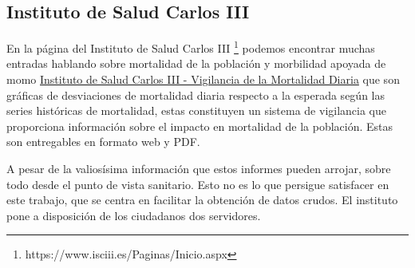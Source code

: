 \subsection{Instituto de Salud Carlos III}
En la página del Instituto de Salud Carlos III
\footnote{https://www.isciii.es/Paginas/Inicio.aspx} podemos encontrar muchas entradas
hablando sobre \Gls{mortalidad} de la población y \Gls{morbilidad} apoyada de \Gls{momo}
\href{https://www.isciii.es/QueHacemos/Servicios/VigilanciaSaludPublicaRENAVE/EnfermedadesTransmisibles/MoMo/Paginas/default.aspx}{Instituto
de Salud Carlos III - Vigilancia de la Mortalidad Diaria} que son gráficas de desviaciones
de mortalidad diaria respecto a la esperada según las series históricas de mortalidad,
estas constituyen un sistema de vigilancia que proporciona información sobre el impacto en
mortalidad de la población. Estas son entregables en formato web y PDF.

A pesar de la valiosísima información que estos informes pueden arrojar, sobre todo desde
el punto de vista sanitario. Esto no es lo que persigue satisfacer en este trabajo, que se
centra en facilitar la obtención de datos crudos. El instituto pone a disposición de los
ciudadanos dos servidores.

